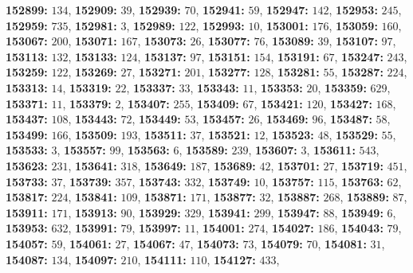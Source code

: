 \textsf{\bfseries 152899:} $134$, \textsf{\bfseries 152909:} $39$, \textsf{\bfseries 152939:} $70$, \textsf{\bfseries 152941:} $59$, \textsf{\bfseries 152947:} $142$, \textsf{\bfseries 152953:} $245$, \textsf{\bfseries 152959:} $735$, \textsf{\bfseries 152981:} $3$, \textsf{\bfseries 152989:} $122$, \textsf{\bfseries 152993:} $10$, \textsf{\bfseries 153001:} $176$, \textsf{\bfseries 153059:} $160$, \textsf{\bfseries 153067:} $200$, \textsf{\bfseries 153071:} $167$, \textsf{\bfseries 153073:} $26$, \textsf{\bfseries 153077:} $76$, \textsf{\bfseries 153089:} $39$, \textsf{\bfseries 153107:} $97$, \textsf{\bfseries 153113:} $132$, \textsf{\bfseries 153133:} $124$, \textsf{\bfseries 153137:} $97$, \textsf{\bfseries 153151:} $154$, \textsf{\bfseries 153191:} $67$, \textsf{\bfseries 153247:} $243$, \textsf{\bfseries 153259:} $122$, \textsf{\bfseries 153269:} $27$, \textsf{\bfseries 153271:} $201$, \textsf{\bfseries 153277:} $128$, \textsf{\bfseries 153281:} $55$, \textsf{\bfseries 153287:} $224$, \textsf{\bfseries 153313:} $14$, \textsf{\bfseries 153319:} $22$, \textsf{\bfseries 153337:} $33$, \textsf{\bfseries 153343:} $11$, \textsf{\bfseries 153353:} $20$, \textsf{\bfseries 153359:} $629$, \textsf{\bfseries 153371:} $11$, \textsf{\bfseries 153379:} $2$, \textsf{\bfseries 153407:} $255$, \textsf{\bfseries 153409:} $67$, \textsf{\bfseries 153421:} $120$, \textsf{\bfseries 153427:} $168$, \textsf{\bfseries 153437:} $108$, \textsf{\bfseries 153443:} $72$, \textsf{\bfseries 153449:} $53$, \textsf{\bfseries 153457:} $26$, \textsf{\bfseries 153469:} $96$, \textsf{\bfseries 153487:} $58$, \textsf{\bfseries 153499:} $166$, \textsf{\bfseries 153509:} $193$, \textsf{\bfseries 153511:} $37$, \textsf{\bfseries 153521:} $12$, \textsf{\bfseries 153523:} $48$, \textsf{\bfseries 153529:} $55$, \textsf{\bfseries 153533:} $3$, \textsf{\bfseries 153557:} $99$, \textsf{\bfseries 153563:} $6$, \textsf{\bfseries 153589:} $239$, \textsf{\bfseries 153607:} $3$, \textsf{\bfseries 153611:} $543$, \textsf{\bfseries 153623:} $231$, \textsf{\bfseries 153641:} $318$, \textsf{\bfseries 153649:} $187$, \textsf{\bfseries 153689:} $42$, \textsf{\bfseries 153701:} $27$, \textsf{\bfseries 153719:} $451$, \textsf{\bfseries 153733:} $37$, \textsf{\bfseries 153739:} $357$, \textsf{\bfseries 153743:} $332$, \textsf{\bfseries 153749:} $10$, \textsf{\bfseries 153757:} $115$, \textsf{\bfseries 153763:} $62$, \textsf{\bfseries 153817:} $224$, \textsf{\bfseries 153841:} $109$, \textsf{\bfseries 153871:} $171$, \textsf{\bfseries 153877:} $32$, \textsf{\bfseries 153887:} $268$, \textsf{\bfseries 153889:} $87$, \textsf{\bfseries 153911:} $171$, \textsf{\bfseries 153913:} $90$, \textsf{\bfseries 153929:} $329$, \textsf{\bfseries 153941:} $299$, \textsf{\bfseries 153947:} $88$, \textsf{\bfseries 153949:} $6$, \textsf{\bfseries 153953:} $632$, \textsf{\bfseries 153991:} $79$, \textsf{\bfseries 153997:} $11$, \textsf{\bfseries 154001:} $274$, \textsf{\bfseries 154027:} $186$, \textsf{\bfseries 154043:} $79$, \textsf{\bfseries 154057:} $59$, \textsf{\bfseries 154061:} $27$, \textsf{\bfseries 154067:} $47$, \textsf{\bfseries 154073:} $73$, \textsf{\bfseries 154079:} $70$, \textsf{\bfseries 154081:} $31$, \textsf{\bfseries 154087:} $134$, \textsf{\bfseries 154097:} $210$, \textsf{\bfseries 154111:} $110$, \textsf{\bfseries 154127:} $433$, 

